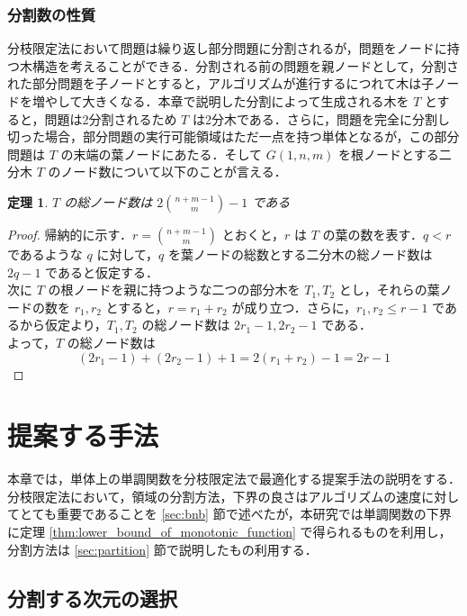 \documentclass[a4paper,11pt]{jreport}
\newtheorem{theorem}{定理}
\begin{document}
\subsection{分割数の性質} \label{sec:number_of_partition}

分枝限定法において問題は繰り返し部分問題に分割されるが，問題をノードに持つ木構造を考えることができる．分割される前の問題を親ノードとして，分割された部分問題を子ノードとすると，アルゴリズムが進行するにつれて木は子ノードを増やして大きくなる．本章で説明した分割によって生成される木を $ T $ とすると，問題は2分割されるため $ T $ は2分木である．さらに，問題を完全に分割し切った場合，部分問題の実行可能領域はただ一点を持つ単体となるが，この部分問題は $ T $ の末端の葉ノードにあたる．そして $ G(1, n, m) $ を根ノードとする二分木 $ T $ のノード数について以下のことが言える．

\begin{theorem} \label{thm:total_node}
$ T $ の総ノード数は $ 2 \binom{n + m - 1}{m} - 1 $ である
\end{theorem}
\begin{proof}
帰納的に示す．$ r = \binom{n + m - 1}{m} $ とおくと，$ r $ は $ T $ の葉の数を表す．$ q < r $ であるような $ q $ に対して，$ q $ を葉ノードの総数とする二分木の総ノード数は $ 2q - 1 $ であると仮定する．\\
次に $ T $ の根ノードを親に持つような二つの部分木を $ T_1, T_2 $ とし，それらの葉ノードの数を $ r_1, r_2 $ とすると，$ r = r_1 + r_2 $ が成り立つ．さらに，$ r_1, r_2 \leq r - 1 $ であるから仮定より，$ T_1, T_2 $ の総ノード数は $ 2r_1 - 1, 2r_2 - 1 $ である．\\
よって，$ T $ の総ノード数は
$$ (2r_1 - 1) + (2r_2 - 1) + 1 = 2(r_1 + r_2) - 1 = 2r - 1 $$
\end{proof}

\chapter{提案する手法}

本章では，単体上の単調関数を分枝限定法で最適化する提案手法の説明をする．分枝限定法において，領域の分割方法，下界の良さはアルゴリズムの速度に対してとても重要であることを \ref{sec:bnb} 節で述べたが，本研究では単調関数の下界に定理  \ref{thm:lower_bound_of_monotonic_function} で得られるものを利用し，分割方法は \ref{sec:partition} 節で説明したもの利用する．\par

\section{分割する次元の選択}
\end{document}
